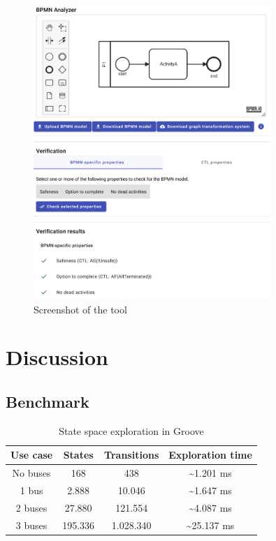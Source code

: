 \documentclass[runningheads]{llncs}
\begin{document}
\begin{figure}[ht]
    \centering
    \includegraphics[width=0.8\textwidth]{images/impl.png}
    \caption{Screenshot of the tool}
    \label{fig:implScreenshot}
\end{figure}

\section{Discussion}

\subsection{Benchmark}

\begin{table}[ht]
\centering

\begin{tabular}{|c || c | c | c |}
 \hline
 Use case & States & Transitions & Exploration time \\
 \hline\hline
 No buses & 168 & 438 & \textasciitilde 1.201 ms \\
 \hline
 1 bus & 2.888 & 10.046 & \textasciitilde 1.647 ms \\
 \hline
 2 buses & 27.880 & 121.554 & \textasciitilde 4.087 ms \\
 \hline
 3 buses & 195.336 & 1.028.340 & \textasciitilde 25.137 ms \\
 \hline
\end{tabular}
\caption[State space exploration in Groove]{State space exploration in Groove}
\label{table:grooveRuntime}
\end{table}
\end{document}
